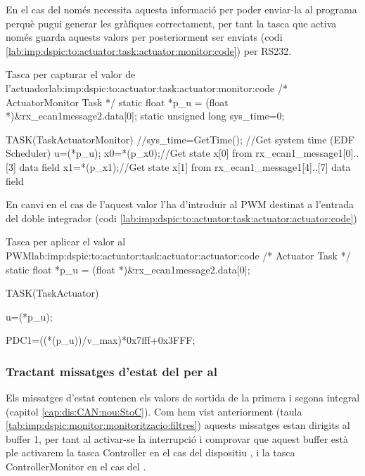 En el cas del \Monitor només necessita aquesta informació per poder enviar-la al programa \DCSMonitor perquè pugui generar les gràfiques correctament, per tant la tasca que activa només guarda aquests valors per posteriorment ser enviats (codi \ref{lab:imp:dspic:to:actuator:task:actuator:monitor:code}) per RS232.

\begin{code_c}{Tasca per capturar el valor de l'actuador}{lab:imp:dspic:to:actuator:task:actuator:monitor:code}
/* ActuatorMonitor Task */
static float *p_u = (float *)&rx_ecan1message2.data[0];
static unsigned long sys_time=0;

TASK(TaskActuatorMonitor)
{
	//sys_time=GetTime();  //Get system time (EDF Scheduler)
	u=(*p_u);
	x0=*(p_x0);//Get state x[0] from rx_ecan1_message1[0]..[3] data field
	x1=*(p_x1);//Get state x[1] from rx_ecan1_message1[4]..[7] data field
}
\end{code_c}

En canvi en el cas de l'\Actuador aquest valor l'ha d'introduir al PWM destinat a l'entrada del doble integrador (codi \ref{lab:imp:dspic:to:actuator:task:actuator:actuator:code})

\begin{code_c}{Tasca per aplicar el valor al PWM}{lab:imp:dspic:to:actuator:task:actuator:actuator:code}
/* Actuator Task */
static float *p_u = (float *)&rx_ecan1message2.data[0];

TASK(TaskActuator)
{
	u=(*p_u);

	PDC1=((*(p_u))/v_max)*0x7fff+0x3FFF;
}
\end{code_c}

\subsubsection{Tractant missatges d'estat del \Sensor per al \Controlador}\label{lab:imp:dspic:ID_FROM_SENSOR}

Els missatges d'estat contenen els valors de sortida de la primera i segona integral (capitol \ref{cap:dis:CAN:nou:StoC}). Com hem vist anteriorment (taula \ref{tab:imp:dspic:monitor:monitoritzacio:filtres}) aquests missatges estan dirigits al buffer 1, per tant al activar-se la interrupció i comprovar que aquest buffer està ple activarem la tasca Controller en el cas del dispositiu \Controlador, i la tasca ControllerMonitor en el cas del \Monitor.

